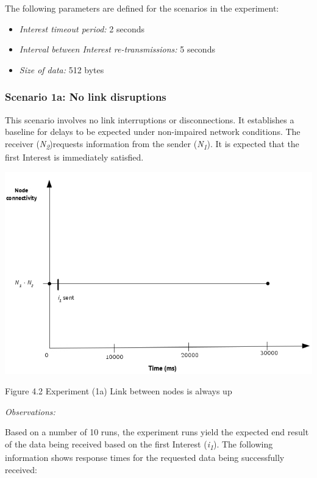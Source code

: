 \documentclass[a4paper,12pt]{report}      %
\begin{document}
\noindent The following parameters are defined for the scenarios in the experiment:
\begin{itemize}
\item \textsl{Interest timeout period:}  2 seconds
\item \textsl{Interval between Interest re-transmissions:} 5 seconds
\item \textsl{Size of data:} 512 bytes
\end{itemize}

\subsubsection{Scenario 1a: No link disruptions}

This scenario involves no link interruptions or disconnections. It establishes a baseline for delays to be expected under non-impaired network conditions. The receiver (\emph{N\textsubscript{2}})requests information from the sender (\emph{N\textsubscript{1}}). It is expected that the first Interest is immediately satisfied.

\noindent\includegraphics[scale=0.55]{exp1a_timediag.jpg}\newline
\begin{center}Figure 4.2 Experiment (1a) Link between nodes is always up\end{center}

\vspace*{1\baselineskip}\noindent\emph{Observations:}

Based on a number of 10 runs, the experiment runs yield the expected end result of the data being received
based on the first Interest (\emph{i\textsubscript{1}}). The following information shows response times for the requested
data being successfully received:
\end{document}
